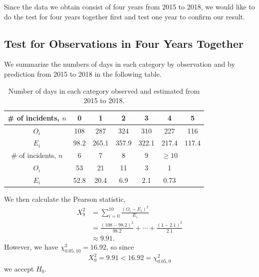 \documentclass[11pt,a4paper,english]{article}
\begin{document}
Since the data we obtain consist of four years from 2015 to 2018, we would like to do the test for four years together first and test one year to confirm our result. 

\subsection{Test for Observations in Four Years Together}
We summarize the numbers of days in each category by observation and by prediction from 2015 to 2018 in the following table.
\begin{table}[htbp]
    \centering
	\begin{tabular}{c|cccccc}
		\hline
        \# of incidents, $n$ & 0 & 1 & 2 & 3 & 4 & 5 \\
		\hline
		$O_{i}$ & 108 & 287 & 324 & 310 & 227 & 116\\
		\hline
		$E_{i}$ & 98.2 & 265.1 & 357.9 & 322.1 & 217.4 & 117.4\\ 
		\hline
		\hline
		\# of incidents, $n$ & 6 & 7 & 8 & 9 & $\geq 10$ & \\
		\hline
		$O_{i}$ & 53 & 21 & 11 & 3 & 1 &\\
		\hline
		$E_{i}$  & 52.8 & 20.4 & 6.9 & 2.1 & 0.73 & \\ 
		\hline 
    \end{tabular}
	\caption{Number of days in each category observed and estimated from 2015 to 2018.}
\end{table}

We then calculate the Pearson statistic,
\[
	\begin{aligned}
		X_{9}^{2} &= \sum_{i = 0}^{10}\frac{(O_{i}-E_{i})^{2}}{E_{i}}\\
		&= \frac{(108-98.2)^{2}}{98.2}+\cdots+\frac{(1-2.1)^{2}}{2.1}\\
		&\approx 9.91.
	\end{aligned}
\] 
However, we have $\chi^{2}_{0.05,10} = 16.92$, so since 
\[X_{9}^{2} = 9.91 < 16.92 = \chi_{0.05,9}^{2}\]
we accept $H_{0}$.
\end{document}
